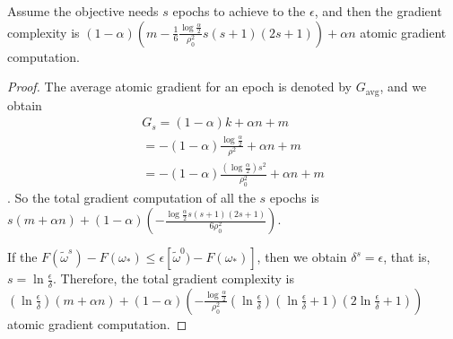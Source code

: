 \documentclass[letterpaper]{article}
\begin{document}
\begin{Theorem}
\label{theorem_converge}
Assume the objective needs $s$ epochs to achieve to the $\epsilon$, and then the gradient complexity is $(1-\alpha)\left( m-\frac{1}{6} \frac{\log\frac{\alpha}{2}}{\rho_0^2} s(s+1)(2s+1) \right) + \alpha n$ atomic gradient computation.
\end{Theorem}
\begin{proof}
The average atomic gradient for an epoch is denoted by $G_\mathrm{avg}$, and we obtain
\begin{equation}
\label{equa_gradient_complexity_1}
\begin{array}{ll}
G_s = (1-\alpha) k + \alpha n +m \\
= -(1-\alpha) \frac{\log\frac{\alpha}{2}}{\rho^2} + \alpha n +m \\
=- (1-\alpha)  \frac{\left(\log\frac{\alpha}{2}\right)s^2}{\rho_0^2} +\alpha n +m
\end{array}
\end{equation}. So the total gradient computation of all the $s$ epochs is $s(m+\alpha n)+(1-\alpha)\left( - \frac{\log\frac{\alpha}{2}s(s+1)(2s+1)}{6\rho_0^2} \right) $.

If the $F(\tilde{\omega}^s)-F(\omega_\ast) \le \epsilon [\tilde{\omega}^0)-F(\omega_\ast)]$, then we obtain $\delta^s = \epsilon$, that is, $s=\ln \frac{\epsilon}{\delta}$. Therefore, the total  gradient complexity is 
$(\ln \frac{\epsilon}{\delta})(m+\alpha n)+(1-\alpha)\left( - \frac{\log\frac{\alpha}{2}}{\rho_0^2} (\ln \frac{\epsilon}{\delta})(\ln \frac{\epsilon}{\delta}+1)(2\ln \frac{\epsilon}{\delta}+1)\right) $ atomic gradient computation. 

\end{proof}
\end{document}
